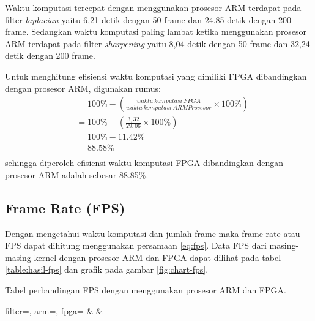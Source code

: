 Waktu komputasi tercepat dengan menggunakan prosesor ARM terdapat pada filter \textit{laplacian} yaitu 6,21 detik dengan 50 frame dan 24.85 detik dengan 200 frame. Sedangkan waktu komputasi paling lambat ketika menggunakan prosesor ARM terdapat pada filter \textit{sharpening} yaitu 8,04 detik dengan 50 frame dan 32,24 detik dengan 200 frame. 

Untuk menghitung efisiensi waktu komputasi yang dimiliki FPGA dibandingkan dengan prosesor ARM, digunakan rumus:
\begin{equation*}
    \begin{split}
& = 100\% - \left( \frac{waktu\ komputasi\ FPGA}{waktu\ komputasi\ ARM Prosesor} \times 100\% \right) \\
& = 100\% - \left( \frac{3,32}{29,06} \times 100\% \right) \\
& = 100\% - 11.42\% \\
& = 88.58\% \\
    \end{split}
\end{equation*}
sehingga diperoleh efisiensi waktu komputasi FPGA dibandingkan dengan prosesor ARM adalah sebesar 88.85\%.

\subsection{Frame Rate (FPS)}
Dengan mengetahui waktu komputasi dan jumlah frame maka frame rate atau FPS dapat dihitung menggunakan persamaan \ref{eq:fps}. Data FPS dari masing-masing kernel dengan prosesor ARM dan FPGA dapat dilihat pada tabel \ref{table:hasil-fps} dan grafik pada gambar \ref{fig:chart-fps}.
\begin{atable}
    \caption{Tabel perbandingan FPS dengan menggunakan prosesor ARM dan FPGA.}
    \label{table:hasil-fps}
        {
            filter=\filter, 
            arm=\arm, 
            fpga=\fpga}
        {
            \filter & 
            \arm & 
            \fpga }
\end{atable}

